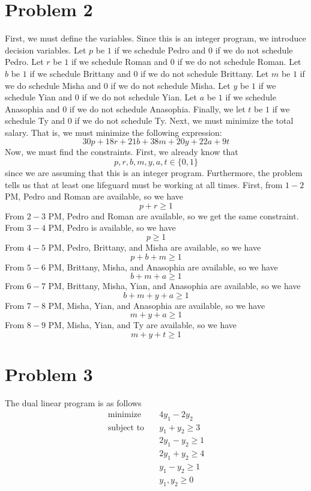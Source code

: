 \documentclass[12pt]{article}
\begin{document}
\section*{Problem 2}
First, we must define the variables. Since this is an integer program, we introduce decision variables. Let $p$ be $1$ if we schedule Pedro and $0$ if we do not schedule Pedro. Let $r$ be $1$ if we schedule Roman and $0$ if we do not schedule Roman. Let $b$ be $1$ if we schedule Brittany and $0$ if we do not schedule Brittany. Let $m$ be $1$ if we do schedule Misha and $0$ if we do not schedule Misha. Let $y$ be $1$ if we schedule Yian and $0$ if we do not schedule Yian. Let $a$ be $1$ if we schedule Anasophia and $0$ if we do not schedule Anasophia. Finally, we let $t$ be $1$ if we schedule Ty and $0$ if we do not schedule Ty. Next, we must minimize the total salary. That is, we must minimize the following expression:
\[
30p + 18r + 21b + 38m + 20y + 22a + 9t
\] Now, we must find the constraints. First, we already know that
\[
p,r,b,m,y,a,t \in \{0,1\}
\] since we are assuming that this is an integer program. Furthermore, the problem tells us that at least one lifeguard must be working at all times. First, from $1-2$ PM, Pedro and Roman are available, so we have
\[
p+r \geq 1
\] From $2-3$ PM, Pedro and Roman are available, so we get the same constraint. From $3-4$ PM, Pedro is available, so we have
\[
p \geq 1
\] From $4-5$ PM, Pedro, Brittany, and Misha are available, so we have
\[
p+b+m \geq 1
\] From $5-6$ PM, Brittany, Misha, and Anasophia are available, so we have
\[
b+m+a \geq 1
\] From $6-7$ PM, Brittany, Misha, Yian, and Anasophia are available, so we have
\[
b+m+y+a \geq 1
\] From $7-8$ PM, Misha, Yian, and Anasophia are available, so we have
\[
m+y+a\geq 1
\] From $8-9$ PM, Misha, Yian, and Ty are available, so we have
\[
m+y+t\geq 1
\] 
\newpage
\section*{Problem 3}
The dual linear program is as follows
\begin{align*}
\text{minimize}\quad &4y_1 -2y_2 \\
\text{subject to}\quad &y_1 + y_2 \geq 3\\
&2y_1-y_2 \geq 1\\
&2y_1 + y_2 \geq 4\\
&y_1 - y_2 \geq 1\\
&y_1,y_2 \geq 0
\end{align*}
\end{document}
